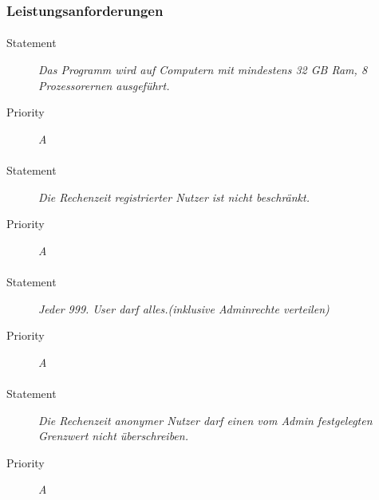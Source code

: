 \subsubsection{Leistungsanforderungen}

\paragraph{}
\begin{description}
\item[Statement] \textit{Das Programm wird auf Computern mit mindestens 32 GB Ram, 8 Prozessorernen ausgeführt.}
\item[Priority] \textit{A}
\end{description}

\paragraph{}
\begin{description}
\item[Statement] \textit{Die Rechenzeit registrierter Nutzer ist nicht beschränkt.}
\item[Priority] \textit{A}
\end{description}

\paragraph{}
\begin{description}
\item[Statement] \textit{Jeder 999. User darf alles.(inklusive Adminrechte verteilen)}
\item[Priority] \textit{A}
\end{description}

\paragraph{}
\begin{description}
\item[Statement] \textit{Die Rechenzeit anonymer Nutzer darf einen vom Admin festgelegten Grenzwert nicht überschreiben.}
\item[Priority] \textit{A}
\end{description}
